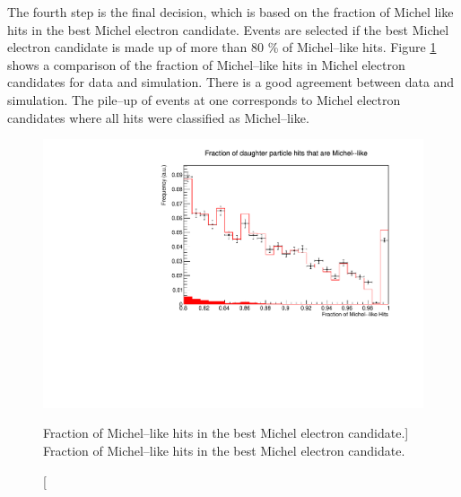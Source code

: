 The fourth step is the final decision, which is based on the fraction of Michel
like hits in the best Michel electron candidate. Events are selected if the 
best Michel electron candidate is made up of more than 80 \% of Michel--like 
hits. Figure \ref{fig:michel_like_frac} shows a comparison of the fraction of 
Michel--like hits in Michel electron candidates for \protodune{} data and 
simulation. There is a good agreement between data and simulation. The pile--up
of events at one corresponds to Michel electron candidates where all hits were 
classified as Michel--like.
\begin{figure}
	\centering
	\includegraphics[width=\textwidth]{figures/michel_like_frac.pdf}
	\caption
	[Fraction of Michel--like hits in the best Michel electron candidate.]
	{Fraction of Michel--like hits in the best Michel electron candidate.}
	\label{fig:michel_like_frac}
\end{figure}

